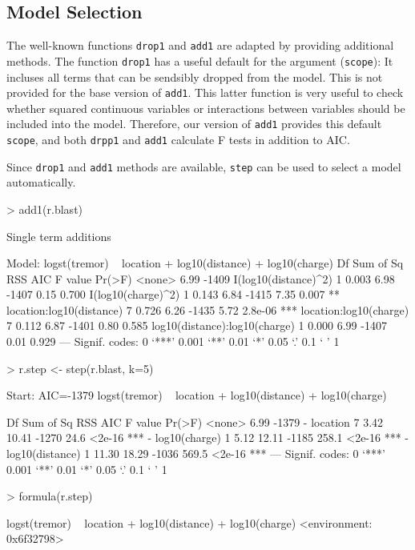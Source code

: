 \documentclass[11pt]{article}
\providecommand{\T}{\texttt}
\begin{document}
\subsection{Model Selection}
The well-known functions \T{drop1} and \T{add1} are adapted by 
providing additional methods. 
The function \T{drop1} has a useful default for the argument (\T{scope}):
It incluses all terms that can be sendsibly dropped from the model.
This is not provided for the base version of \T{add1}. 
This latter function is very useful to check whether squared continuous
variables or interactions between variables should be included into the
model. Therefore, our version of \T{add1} provides this default \T{scope},
and both \T{drpp1} and \T{add1} calculate F tests in addition to AIC.

Since \T{drop1} and \T{add1} methods are available, \T{step} can be used to
select a model automatically.

\begin{Schunk}
\begin{Sinput}
> add1(r.blast)
\end{Sinput}
\begin{Soutput}
Single term additions

Model:
logst(tremor) ~ location + log10(distance) + log10(charge)
                              Df Sum of Sq  RSS   AIC F value  Pr(>F)    
<none>                                     6.99 -1409                    
I(log10(distance)^2)           1     0.003 6.98 -1407    0.15   0.700    
I(log10(charge)^2)             1     0.143 6.84 -1415    7.35   0.007 ** 
location:log10(distance)       7     0.726 6.26 -1435    5.72 2.8e-06 ***
location:log10(charge)         7     0.112 6.87 -1401    0.80   0.585    
log10(distance):log10(charge)  1     0.000 6.99 -1407    0.01   0.929    
---
Signif. codes:  0 ‘***’ 0.001 ‘**’ 0.01 ‘*’ 0.05 ‘.’ 0.1 ‘ ’ 1
\end{Soutput}
\begin{Sinput}
> r.step <- step(r.blast, k=5)
\end{Sinput}
\begin{Soutput}
Start:  AIC=-1379
logst(tremor) ~ location + log10(distance) + log10(charge)

                  Df Sum of Sq   RSS   AIC F value Pr(>F)    
<none>                          6.99 -1379                   
- location         7      3.42 10.41 -1270    24.6 <2e-16 ***
- log10(charge)    1      5.12 12.11 -1185   258.1 <2e-16 ***
- log10(distance)  1     11.30 18.29 -1036   569.5 <2e-16 ***
---
Signif. codes:  0 ‘***’ 0.001 ‘**’ 0.01 ‘*’ 0.05 ‘.’ 0.1 ‘ ’ 1
\end{Soutput}
\begin{Sinput}
> formula(r.step)
\end{Sinput}
\begin{Soutput}
logst(tremor) ~ location + log10(distance) + log10(charge)
<environment: 0x6f32798>
\end{Soutput}
\end{Schunk}
\end{document}

